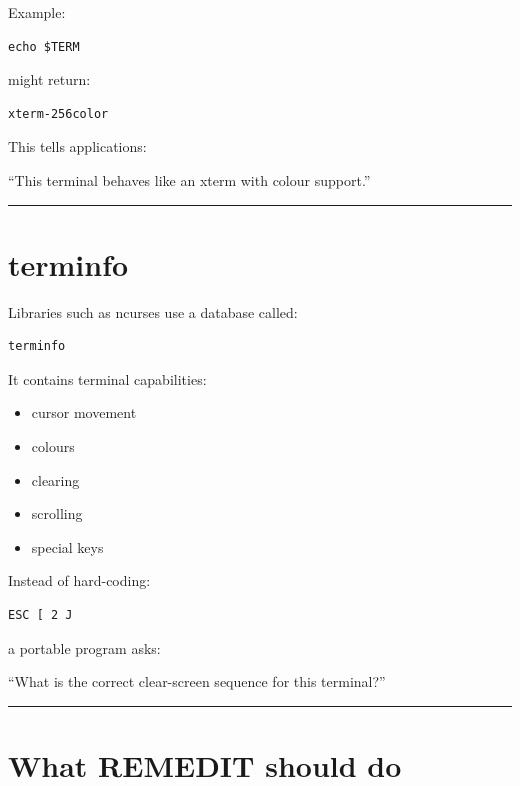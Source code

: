 \documentclass[
  oneside,
  openany]{book}
\providecommand{\tightlist}{%
  \setlength{\itemsep}{0pt}\setlength{\parskip}{0pt}}
\begin{document}
Example:

\begin{verbatim}
echo $TERM
\end{verbatim}

might return:

\begin{verbatim}
xterm-256color
\end{verbatim}

This tells applications:

``This terminal behaves like an xterm with colour support.''

\begin{center}\rule{0.5\linewidth}{0.5pt}\end{center}

\hypertarget{terminfo}{%
\section{terminfo}\label{terminfo}}

Libraries such as ncurses use a database called:

\begin{verbatim}
terminfo
\end{verbatim}

It contains terminal capabilities:

\begin{itemize}
\tightlist
\item
  cursor movement
\item
  colours
\item
  clearing
\item
  scrolling
\item
  special keys
\end{itemize}

Instead of hard-coding:

\begin{verbatim}
ESC [ 2 J
\end{verbatim}

a portable program asks:

``What is the correct clear-screen sequence for this terminal?''

\begin{center}\rule{0.5\linewidth}{0.5pt}\end{center}

\hypertarget{what-remedit-should-do}{%
\section{What REMEDIT should do}\label{what-remedit-should-do}}
\end{document}
